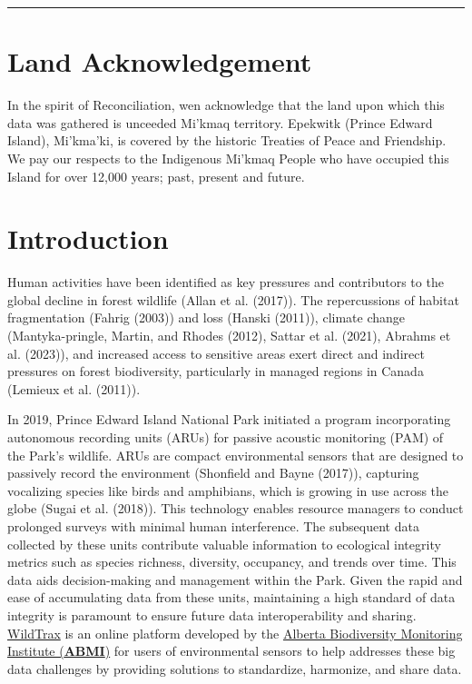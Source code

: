 \documentclass[
  letterpaper,
  DIV=11,
  numbers=noendperiod]{scrartcl}
\begin{document}
\begin{center}\rule{0.5\linewidth}{0.5pt}\end{center}

\section{Land Acknowledgement}\label{land-acknowledgement}

In the spirit of Reconciliation, wen acknowledge that the land upon
which this data was gathered is unceeded Mi'kmaq territory. Epekwitk
(Prince Edward Island), Mi'kma'ki, is covered by the historic Treaties
of Peace and Friendship. We pay our respects to the Indigenous Mi'kmaq
People who have occupied this Island for over 12,000 years; past,
present and future.

\section{Introduction}\label{introduction}

Human activities have been identified as key pressures and contributors
to the global decline in forest wildlife (Allan et al. (2017)). The
repercussions of habitat fragmentation (Fahrig (2003)) and loss (Hanski
(2011)), climate change (Mantyka-pringle, Martin, and Rhodes (2012),
Sattar et al. (2021), Abrahms et al. (2023)), and increased access to
sensitive areas exert direct and indirect pressures on forest
biodiversity, particularly in managed regions in Canada (Lemieux et al.
(2011)).

In 2019, Prince Edward Island National Park initiated a program
incorporating autonomous recording units (ARUs) for passive acoustic
monitoring (PAM) of the Park's wildlife. ARUs are compact environmental
sensors that are designed to passively record the environment (Shonfield
and Bayne (2017)), capturing vocalizing species like birds and
amphibians, which is growing in use across the globe (Sugai et al.
(2018)). This technology enables resource managers to conduct prolonged
surveys with minimal human interference. The subsequent data collected
by these units contribute valuable information to ecological integrity
metrics such as species richness, diversity, occupancy, and trends over
time. This data aids decision-making and management within the Park.
Given the rapid and ease of accumulating data from these units,
maintaining a high standard of data integrity is paramount to ensure
future data interoperability and sharing.
\href{https://www.wildtrax.ca}{WildTrax} is an online platform developed
by the \href{https://abmi.ca}{Alberta Biodiversity Monitoring Institute
(\textbf{ABMI})} for users of environmental sensors to help addresses
these big data challenges by providing solutions to standardize,
harmonize, and share data.
\end{document}
